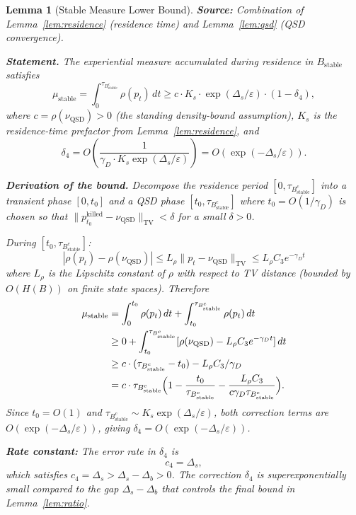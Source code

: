 \documentclass[11pt]{article}
\newtheorem{lemma}{Lemma}
\newcommand{\eps}{\varepsilon}
\newcommand{\Ds}{\Delta_s}
\newcommand{\Db}{\Delta_b}
\newcommand{\Bstable}{B_{\mathrm{stable}}}
\newcommand{\TV}{\mathrm{TV}}
\newcommand{\QSD}{\mathrm{QSD}}
\begin{document}
\begin{lemma}[Stable Measure Lower Bound]\label{lem:stable-lower}
\textbf{Source:} Combination of Lemma~\ref{lem:residence}
(residence time) and Lemma~\ref{lem:qsd} (QSD convergence).

\medskip
\textbf{Statement.}
The experiential measure accumulated during residence in $\Bstable$
satisfies
\begin{equation}\label{eq:mu-stable}
  \mu_{\mathrm{stable}}
  = \int_0^{\tau_{\Bstable^c}} \rho(p_t)\, dt
  \geq c \cdot K_s \cdot \exp(\Ds/\eps) \cdot (1 - \delta_4),
\end{equation}
where $c = \rho(\nu_\QSD) > 0$ (the standing density-bound assumption),
$K_s$ is the residence-time prefactor from Lemma~\ref{lem:residence},
and
\begin{equation}\label{eq:delta4}
  \delta_4 = O\!\left(\frac{1}{\gamma_D \cdot K_s \exp(\Ds/\eps)}\right)
  = O(\exp(-\Ds/\eps)).
\end{equation}

\medskip
\textbf{Derivation of the bound.}
Decompose the residence period $[0, \tau_{\Bstable^c}]$ into
a transient phase $[0, t_0]$ and a QSD phase $[t_0, \tau_{\Bstable^c}]$
where $t_0 = O(1/\gamma_D)$ is chosen so that
$\|p_{t_0}^{\mathrm{killed}} - \nu_\QSD\|_\TV < \delta$ for a small
$\delta > 0$.

During $[t_0, \tau_{\Bstable^c}]$:
\[
  |\rho(p_t) - \rho(\nu_\QSD)|
  \leq L_\rho \|p_t - \nu_\QSD\|_\TV
  \leq L_\rho C_3 e^{-\gamma_D t}
\]
where $L_\rho$ is the Lipschitz constant of $\rho$ with respect to
TV distance (bounded by $O(H(B))$ on finite state spaces).
Therefore
\begin{align*}
  \mu_{\mathrm{stable}}
  &= \int_0^{t_0} \rho(p_t)\, dt
     + \int_{t_0}^{\tau_{\Bstable^c}} \rho(p_t)\, dt \\
  &\geq 0 + \int_{t_0}^{\tau_{\Bstable^c}}
    [\rho(\nu_\QSD) - L_\rho C_3 e^{-\gamma_D t}]\, dt \\
  &\geq c \cdot (\tau_{\Bstable^c} - t_0)
    - L_\rho C_3 / \gamma_D \\
  &= c \cdot \tau_{\Bstable^c}
    \Bigl(1 - \frac{t_0}{\tau_{\Bstable^c}}
    - \frac{L_\rho C_3}{c \gamma_D \tau_{\Bstable^c}}\Bigr).
\end{align*}
Since $t_0 = O(1)$ and
$\tau_{\Bstable^c} \sim K_s \exp(\Ds/\eps)$, both correction terms
are $O(\exp(-\Ds/\eps))$, giving $\delta_4 = O(\exp(-\Ds/\eps))$.

\medskip
\textbf{Rate constant:}
The error rate in $\delta_4$ is
\begin{equation}\label{eq:c4}
  c_4 = \Ds,
\end{equation}
which satisfies $c_4 = \Ds > \Ds - \Db > 0$.
The correction $\delta_4$ is superexponentially small compared to
the gap $\Ds - \Db$ that controls the final bound in Lemma~\ref{lem:ratio}.


\end{lemma}
\end{document}

